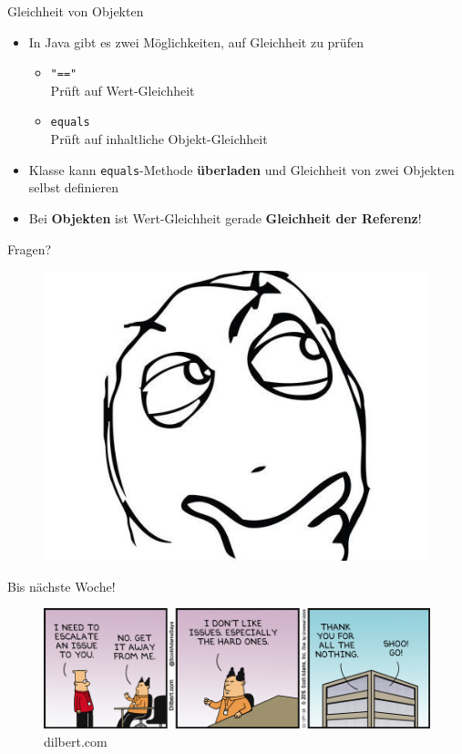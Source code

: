 \documentclass[18pt]{beamer}
\begin{document}
\begin{frame}{Gleichheit von Objekten}
    \begin{itemize}
        \item In Java gibt es zwei Möglichkeiten, auf Gleichheit zu prüfen
        \begin{itemize}
            \item \texttt{"=="}\\
            Prüft auf Wert-Gleichheit

            \item \texttt{equals}\\
            Prüft auf inhaltliche Objekt-Gleichheit
        \end{itemize}
        \item Klasse kann \texttt{equals}-Methode \textbf{überladen} und Gleichheit von zwei Objekten selbst definieren
        \item \alert{Bei \textbf{Objekten} ist Wert-Gleichheit gerade \textbf{Gleichheit der Referenz}!}
    \end{itemize}
\end{frame}

\begin{frame}{Fragen?}
    \begin{figure}
        \includegraphics[scale=.32]{img/Question-Rage-Face.jpg}
    \end{figure}
\end{frame}

\begin{frame}{Bis nächste Woche!}
    \begin{figure}
        \includegraphics[scale=.5]{img/dt161129.png}
        \caption{\footnotesize{dilbert.com}}
    \end{figure}
\end{frame}

\backupend
\end{document}
